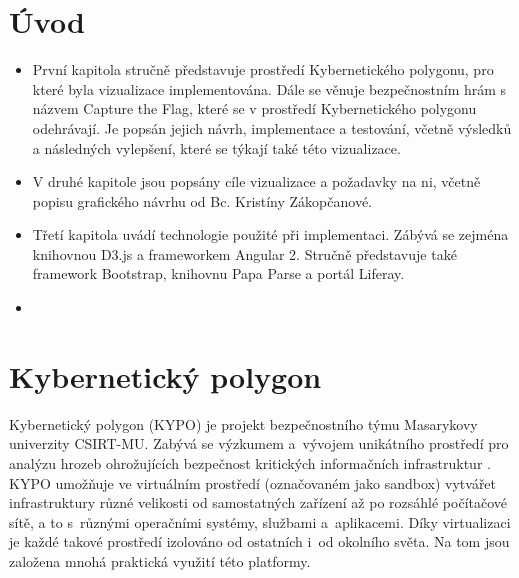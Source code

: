\documentclass[
  digital, %
  oneside, %
  table,   %
  nolof,     %
  nolot,     %
]{fithesis3}
\begin{document}
\chapter{Úvod}

\begin{itemize}
  \item První kapitola stručně představuje prostředí Kybernetického polygonu, pro které byla vizualizace implementována. Dále se věnuje bezpečnostním hrám s názvem Capture the Flag, které se v prostředí Kybernetického polygonu odehrávají. Je popsán jejich návrh, implementace a testování, včetně výsledků a následných vylepšení, které se týkají také této vizualizace.
  \item V druhé kapitole jsou popsány cíle vizualizace a požadavky na ni, včetně popisu grafického návrhu od Bc. Kristíny Zákopčanové.
  \item Třetí kapitola uvádí technologie použité při implementaci. Zábývá se zejména knihovnou D3.js a frameworkem Angular 2. Stručně představuje také framework Bootstrap, knihovnu Papa Parse a portál Liferay.
  \item 
\end{itemize}

\chapter{Kybernetický polygon}
Kybernetický polygon (KYPO) je projekt bezpečnostního týmu Masarykovy univerzity CSIRT-MU. Zabývá se výzkumem a~vývojem unikátního prostředí pro analýzu hrozeb ohrožujících bezpečnost kritických informačních infrastruktur \cite{kypocz}. KYPO umožňuje ve virtuálním prostředí (označovaném jako sandbox) vytvářet infrastruktury různé velikosti od samostatných zařízení až po rozsáhlé počítačové sítě, a to s~různými operačními systémy, službami a~aplikacemi. Díky virtualizaci je každé takové prostředí izolováno od ostatních i~od okolního světa. Na tom jsou založena mnohá praktická využití této platformy.
\end{document}
